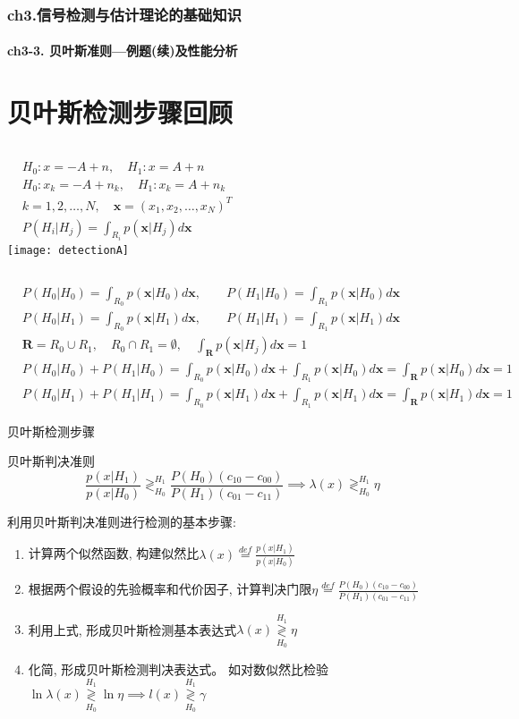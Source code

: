 \begin{frame}[shrink]
  \frametitle{ch3.信号检测与估计理论的基础知识}
  \framesubtitle{ch3-3. 贝叶斯准则---例题(续)及性能分析}
  \tableofcontents[hideallsubsections]
\end{frame}

\section{贝叶斯检测步骤回顾}

\begin{frame}
\begin{columns}
	\begin{align*}
	&H_0: x=-A+n,\quad H_1: x=A+n\\
	&H_0: x_k=-A+n_k,\quad H_1: x_k=A+n_k\\
	&k=1,2,\dots,N,\quad \bm{x}=(x_1,x_2,\dots,x_N)^{T}\\
	&P(H_i|H_j)=\int_{R_i}p(\bm{x}|H_j)d\bm{x}
	\end{align*}
	\texttt{[image: detectionA]}
\end{columns}
\begin{align*}
&P(H_0|H_0)=\int_{R_0}p(\bm{x}|H_0)d\bm{x},\qquad P(H_1|H_0)=\int_{R_1}p(\bm{x}|H_0)d\bm{x}\\
&P(H_0|H_1)=\int_{R_0}p(\bm{x}|H_1)d\bm{x},\qquad P(H_1|H_1)=\int_{R_1}p(\bm{x}|H_1)d\bm{x}\\
&\bm{R}=R_0\cup R_1,\quad R_0\cap R_1=\emptyset, \quad \int_{\bm{R}}p(\bm{x}|H_j)d\bm{x}=1\\
&P(H_0|H_0)+P(H_1|H_0)=\int_{R_0}p(\bm{x}|H_0)d\bm{x}+\int_{R_1}p(\bm{x}|H_0)d\bm{x}=\int_{\bm{R}}p(\bm{x}|H_0)d\bm{x}=1\\
&P(H_0|H_1)+P(H_1|H_1)=\int_{R_0}p(\bm{x}|H_1)d\bm{x}+\int_{R_1}p(\bm{x}|H_1)d\bm{x}=\int_{\bm{R}}p(\bm{x}|H_1)d\bm{x}=1
\end{align*}
\end{frame}

\begin{frame}{贝叶斯检测步骤}
\begin{block}{贝叶斯判决准则}
\[ \frac{p(x|H_1)}{p(x|H_0)}\mathop{\gtrless}_{H_0}^{H_1}\frac{P(H_0)(c_{10}-c_{00})}{P(H_1)(c_{01}-c_{11})} \implies \lambda(x)\mathop{\gtrless}_{H_0}^{H_1}\eta \]
\end{block}
利用贝叶斯判决准则进行检测的基本步骤:
\begin{enumerate}
\item 计算两个似然函数, 构建似然比$\lambda(x)\mathop{=}\limits^{def}\frac{p(x|H_1)}{p(x|H_0)}$
\item 根据两个假设的先验概率和代价因子, 计算判决门限$\eta\mathop{=}\limits^{def}\frac{P(H_0)(c_{10}-c_{00})}{P(H_1)(c_{01}-c_{11})}$
\item 利用上式, 形成贝叶斯检测基本表达式$\lambda(x)\mathop{\gtrless}\limits_{H_0}^{H_1}\eta$
\item 化简, 形成贝叶斯检测判决表达式。 如对数似然比检验$\ln\lambda(x)\mathop{\gtrless}\limits_{H_0}^{H_1}\ln\eta\implies l(x)\mathop{\gtrless}\limits_{H_0}^{H_1}\gamma$
\end{enumerate}
\end{frame}


